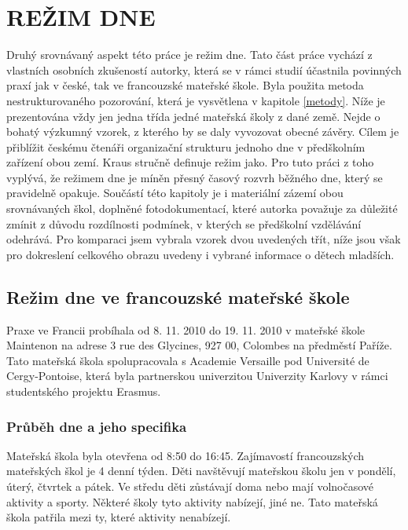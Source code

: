 \chapter{REŽIM DNE}
\label{rezim}

	Druhý srovnávaný aspekt této práce je režim dne. Tato část práce vychází z vlastních osobních zkušeností autorky, která se v rámci studií účastnila povinných praxí jak v české, tak ve francouzské mateřské škole. Byla použita metoda nestrukturovaného pozorování, která je vysvětlena v kapitole \ref{metody}. Níže je prezentována vždy jen jedna třída jedné mateřská školy z dané země. Nejde o bohatý výzkumný vzorek, z kterého by se daly vyvozovat obecné závěry. Cílem je přiblížit českému čtenáři organizační strukturu jednoho dne v předškolním zařízení obou zemí. Kraus stručně definuje režim jako\textit{}. \citep[s.~700]{Kraus}
	Pro tuto práci z toho vyplývá, že režimem dne je míněn přesný časový rozvrh běžného dne, který se pravidelně opakuje.
	Součástí této kapitoly je i materiální zázemí obou srovnávaných škol, doplněné fotodokumentací, které autorka považuje za důležité zmínit z důvodu rozdílnosti podmínek, v kterých se předškolní vzdělávání odehrává.
	Pro komparaci jsem vybrala vzorek dvou uvedených třít, níže jsou však pro dokreslení celkového obrazu uvedeny i vybrané informace o dětech mladších.

	\section{Režim dne ve francouzské mateřské škole}

		Praxe ve Francii probíhala od 8. 11. 2010 do 19. 11. 2010 v mateřské škole Maintenon na adrese 3 rue des Glycines, 927 00, Colombes na předměstí Paříže. Tato mateřská škola spolupracovala s Academie Versaille pod Université de Cergy-Pontoise, která byla partnerskou univerzitou Univerzity Karlovy v rámci studentského projektu Erasmus. 


		\subsection{Průběh dne a jeho specifika}

			Mateřská škola byla otevřena od 8:50 do 16:45. Zajímavostí francouzských mateřských škol je 4 denní týden. Děti navštěvují mateřskou školu jen v pondělí, úterý, čtvrtek a pátek. Ve středu děti zůstávají doma nebo mají volnočasové aktivity a sporty. Některé školy tyto aktivity nabízejí, jiné ne. Tato mateřská škola patřila mezi ty, které aktivity nenabízejí. 
			
